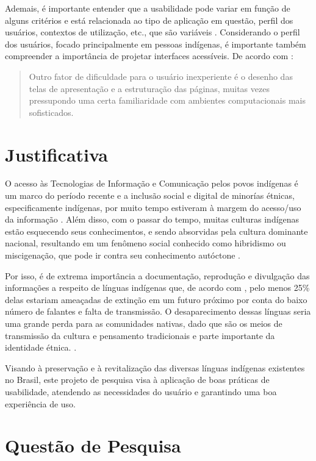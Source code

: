 Ademais, é importante entender que a usabilidade pode variar em função de alguns critérios e está relacionada ao tipo de aplicação em questão, perfil dos usuários,
contextos de utilização, etc., que são variáveis \cite{winckler2022}. Considerando o perfil dos usuários, focado principalmente em pessoas indígenas, é importante também
compreender a importância de projetar interfaces acessíveis. De acordo com :

\begin{quote}
    Outro fator de dificuldade para o usuário inexperiente é o desenho das telas de apresentação e a estruturação das páginas, muitas vezes pressupondo uma certa
    familiaridade com ambientes computacionais mais sofisticados.

\end{quote}

\section{Justificativa}
\label{sec:Justificativa}

O acesso às Tecnologias de Informação e Comunicação pelos povos indígenas é um marco do período recente e a inclusão social e digital de minorías étnicas, especificamente
indígenas, por muito tempo estiveram à margem do acesso/uso da informação \cite{pinto2010}. Além disso, com o passar do tempo, muitas culturas indígenas estão esquecendo
seus conhecimentos, e sendo absorvidas pela cultura dominante nacional, resultando em um fenômeno social conhecido como hibridismo ou miscigenação, que pode ir contra seu
conhecimento autóctone \cite{pinto2010}.

Por isso, é de extrema importância a documentação, reprodução e divulgação das informações a respeito de línguas indígenas que, de acordo com \cite{moore2008}, pelo menos
25\% delas estariam ameaçadas de extinção em um futuro próximo por conta do baixo número de falantes e falta de transmissão. O desaparecimento dessas línguas seria uma
grande perda para as comunidades nativas, dado que são os meios de transmissão da cultura e pensamento tradicionais e parte importante da identidade étnica.
\cite{moore2008}.

Visando à preservação e à revitalização das diversas línguas indígenas existentes no Brasil, este projeto de pesquisa visa à aplicação de boas práticas de usabilidade,
atendendo as necessidades do usuário e garantindo uma boa experiência de uso.


\section{Questão de Pesquisa}
\label{sec:QuestaodePesquisa}

